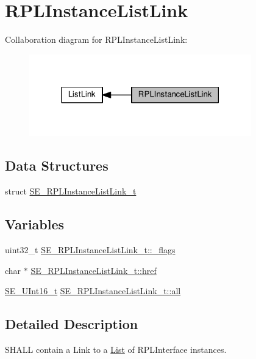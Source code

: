 \hypertarget{group__RPLInstanceListLink}{}\section{R\+P\+L\+Instance\+List\+Link}
\label{group__RPLInstanceListLink}
Collaboration diagram for R\+P\+L\+Instance\+List\+Link\+:\nopagebreak
\begin{figure}[H]
\begin{center}
\leavevmode
\includegraphics[width=273pt]{group__RPLInstanceListLink}
\end{center}
\end{figure}
\subsection*{Data Structures}
\begin{DoxyCompactItemize}
\item 
struct \hyperlink{structSE__RPLInstanceListLink__t}{S\+E\+\_\+\+R\+P\+L\+Instance\+List\+Link\+\_\+t}
\end{DoxyCompactItemize}
\subsection*{Variables}
\begin{DoxyCompactItemize}
\item 
uint32\+\_\+t \hyperlink{group__RPLInstanceListLink_ga6d6d1023c9902e004cc289f39d2d1b6b}{S\+E\+\_\+\+R\+P\+L\+Instance\+List\+Link\+\_\+t\+::\+\_\+flags}
\item 
char $\ast$ \hyperlink{group__RPLInstanceListLink_gaa34aa0bfadddbf5475945072be5facbf}{S\+E\+\_\+\+R\+P\+L\+Instance\+List\+Link\+\_\+t\+::href}
\item 
\hyperlink{group__UInt16_gac68d541f189538bfd30cfaa712d20d29}{S\+E\+\_\+\+U\+Int16\+\_\+t} \hyperlink{group__RPLInstanceListLink_ga7001fa025c0862ff52e99fcd509fe6c0}{S\+E\+\_\+\+R\+P\+L\+Instance\+List\+Link\+\_\+t\+::all}
\end{DoxyCompactItemize}


\subsection{Detailed Description}
S\+H\+A\+LL contain a Link to a \hyperlink{structList}{List} of R\+P\+L\+Interface instances. 

